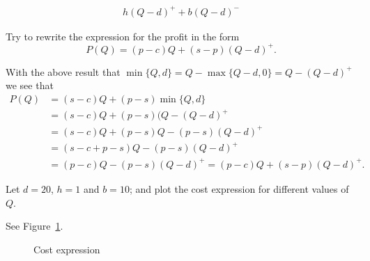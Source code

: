 \begin{solution}
\begin{align*}
h(Q-d)^+ + b(Q-d)^-
\end{align*}
\end{solution}

\begin{question}
Try  to rewrite the  expression for the profit in the form
\begin{equation}\label{eq:1}
P(Q) = (p -c)Q  + (s-p)(Q-d)^+.
\end{equation}
\end{question}

\begin{solution}
With the above  result that $\min\{Q,d\} = Q-\max\{Q-d,0\} = Q - (Q-d)^+$ we see that
\begin{equation*}
  \begin{split}
P(Q) 
&= (s-c)Q + (p-s) \min\{Q,d\}\\
&= (s-c)Q + (p-s) (Q- (Q-d)^+\\
&= (s-c)Q +  (p-s) Q - (p-s)(Q-d)^+\\
&= (s-c + p -s)Q  - (p-s)(Q-d)^+\\
&= (p -c)Q  - (p-s)(Q-d)^+ = (p -c)Q  + (s-p)(Q-d)^+.
  \end{split}
\end{equation*}
\end{solution}


\begin{question}\label{ex:nw_det}
Let $d=20$, $h=1$ and $b=10$; and plot the cost expression for different values of $Q$. 
\end{question}

\begin{solution}
See Figure~\ref{fig:cost_expression}.

\begin{figure}[htbp]
\centering
{}
\caption{Cost expression}
\label{fig:cost_expression}
\end{figure}
\end{solution}

